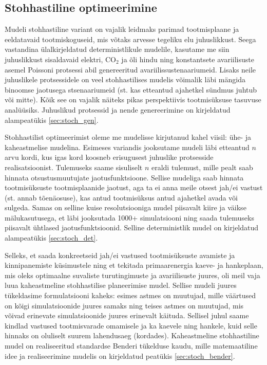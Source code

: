 \documentclass[10pt,a4paper]{article}
\begin{document}
\subsection{Stohhastiline optimeerimine}
Mudeli stohhastiline variant on vajalik leidmaks parimad tootmisplaane ja eeldatavaid tootmiskoguseid, mis võtaks arvesse tegeliku elu juhuslikkust. Seega vastandina ülalkirjeldatud deterministlikule mudelile, kasutame me siin juhuslikkust sisaldavaid elektri, CO$_2$ ja õli hindu ning konstantsete avariilisuste asemel Poissoni protsessi abil genereeritud avariilissustenaariumeid. Lisaks neile juhuslikele protsessidele on veel stohhastilises mudelis võimalik läbi mängida binoomse jaotusega stsenaariumeid (st. kas etteantud ajahetkel sündmus juhtub või mitte). Kõik see on vajalik näiteks pikas perspektiivis tootmisüksuse tasuvuse analüüsiks. Juhuslikud protsessid ja nende genereerimine on kirjeldatud alampeatükis \ref{sec:stoch_gen}.

Stohhastilist optimeerimist oleme me mudelisse kirjutanud kahel viisil: ühe- ja kaheastmelise mudelina. Esimeses variandis jooksutame mudeli läbi etteantud $n$ arvu kordi, kus igas kord koosneb erisugusest juhuslike protsesside realisatsioonist. Tulemuseks saame sisuliselt $n$ eraldi tulemust, mille pealt saab hinnata otsustusmuutujate jaotusfunktsioone. Sellise mudeliga saab hinnata tootmisüksuste tootmisplaanide jaotust, aga ta ei anna meile otsest jah/ei vastust (st. annab tõenäosuse), kas antud tootmisüksus antud ajahetkel avada või sulgeda. Samas on selline kuise resolutsiooniga mudel piisavalt kiire ja väikse mälukasutusega, et läbi jooksutada 1000+ simulatsiooni ning saada tulemuseks piisavalt ühtlased jaotusfunktsioonid. Selline deterministlik mudel on kirjeldatud alampeatükis \ref{sec:stoch_det}. 

Selleks, et saada konkreetseid jah/ei vastused tootmisüksuste avamiste ja kinnipanemiste küsimustele ning et tekitada primaarenergia kaeve- ja hankeplaan, mis oleks optimaalne suvaliste turutingimuste ja avariilisuste juures, oli meil vaja luua kaheastmeline stohhastilise planeerimise mudel. Sellise mudeli juures tükeldasime formulatsiooni kaheks: esimes astmes on muutujad, mille väärtused on kõigi simulatsioonide juures samaks ning teises astmes on muutujad, mis võivad erinevate simulatsioonide juures erinevalt käituda. Sellisel juhul saame kindlad vastused tootmisvarade omamisele ja ka kaevele ning hankele, kuid selle hinnaks on oluliselt suurem lahendusaeg (kordades). Kaheastmeline stohhastiline mudel on realiseeritud standardse Benderi tükelduse kaudu, mille matemaatiline idee ja realiseerimine mudelis on kirjeldatud peatükis \ref{sec:stoch_bender}.
\end{document}
